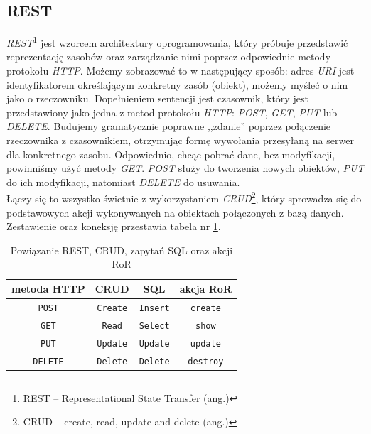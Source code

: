 \documentclass[a4paper,12pt]{article}
\begin{document}
\subsection{REST}\label{sec:rest}
\emph{REST}\footnote{REST -- Representational State Transfer (ang.)} jest wzorcem
architektury oprogramowania, który próbuje przedstawić reprezentację zasobów oraz
zarządzanie nimi poprzez odpowiednie metody protokołu \emph{HTTP}. Możemy zobrazować to w
następujący sposób: adres \emph{URI} jest identyfikatorem określającym konkretny zasób
(obiekt), możemy myśleć o nim jako o rzeczowniku. Dopełnieniem sentencji jest czasownik,
który jest przedstawiony jako jedna z metod protokołu \emph{HTTP}: \emph{POST}, \emph{GET},
\emph{PUT} lub \emph{DELETE}. Budujemy gramatycznie poprawne ,,zdanie'' poprzez
połączenie rzeczownika z czasownikiem, otrzymując formę wywołania przesyłaną na serwer dla
konkretnego zasobu. Odpowiednio, chcąc pobrać dane, bez modyfikacji, powinniśmy użyć
metody \emph{GET}. \emph{POST} służy do tworzenia nowych obiektów, \emph{PUT} do ich
modyfikacji, natomiast \emph{DELETE} do usuwania.\\
Łączy się to wszystko świetnie z wykorzystaniem \emph{CRUD}\footnote{CRUD -- create, read,
update and delete (ang.)}, który sprowadza się do podstawowych akcji wykonywanych na
obiektach połączonych z bazą danych. Zestawienie oraz koneksję przestawia tabela nr
\ref{table:rest}.

\begin{table}[htcb]
  \begin{center}
    \begin{tabular}{|c|c|c|c|}
      \hline
      \textbf{metoda HTTP} & \textbf{CRUD} & \textbf{SQL} & \textbf{akcja RoR}\\
      \hline
      \texttt{POST} & \texttt{Create} & \texttt{Insert} & \texttt{create}\\
      \texttt{GET} & \texttt{Read} & \texttt{Select} & \texttt{show}\\
      \texttt{PUT} & \texttt{Update} & \texttt{Update} & \texttt{update}\\
      \texttt{DELETE} & \texttt{Delete} & \texttt{Delete} & \texttt{destroy}\\
      \hline
    \end{tabular}
  \end{center}
  \caption{Powiązanie REST, CRUD, zapytań SQL oraz akcji RoR}
  \label{table:rest}
\end{table}
\end{document}
